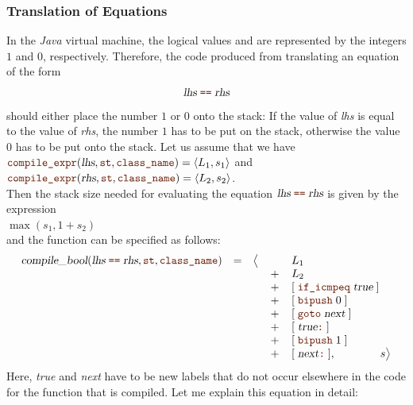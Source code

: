 \subsubsection{Translation of Equations}
In the \textsl{Java} virtual machine, the logical values  and  are represented by
the integers $1$ and $0$, respectively.  Therefore, the code produced from translating an equation of the form 
\[ \textsl{lhs}\; \mytt{==} \;\textsl{rhs} \]
should either place the number $1$ or $0$ onto the stack: If the value of \textsl{lhs} is equal to the value of
\textsl{rhs}, the number $1$ has to be put on the stack, otherwise the value $0$ has to be put onto the stack.
Let us assume that we have
\\[0.2cm]
\hspace*{1.3cm}
$\mytt{compile\_expr}(\textsl{lhs}, \mytt{st}, \mytt{class\_name}) = \pair(L_1, s_1)$ \quad and \\
\hspace*{1.3cm}
$\mytt{compile\_expr}(\textsl{rhs}, \mytt{st}, \mytt{class\_name}) = \pair(L_2, s_2)$.
\\[0.2cm]
Then the stack size needed for evaluating the equation $\textsl{lhs}\; \mytt{==} \;\textsl{rhs}$ is given by
the expression 
\\[0.2cm]
\hspace*{1.3cm}
$\max(s_1, 1 + s_2)$
\\[0.2cm]
and the function  can be specified as follows:
\[
   \begin{array}[t]{lcccl}
   \textsl{compile\_bool}(\textsl{lhs}\;\mytt{==}\;\textsl{rhs}, \mytt{st}, \mytt{class\_name}) & = & 
         \bigl\langle & \quad & L_1  \\
   &&& + & L_2 \\
   &&& + & [ \;\mytt{if\_icmpeq}\; \textsl{true} \; ]  \\
   &&& + & [ \;\mytt{bipush}\;0\; ]  \\
   &&& + & [ \;\mytt{goto}\;\textsl{next}\; ]  \\
   &&& + & [ \;\textsl{true}\mytt{:}\; ]  \\
   &&& + & [ \;\mytt{bipush}\;1\; ]  \\
   &&& + & [ \;\textsl{next}\mytt{:}\; ], \qquad\qquad s \bigr\rangle
   \end{array}
\]
Here, \textsl{true} and \textsl{next} have to be new labels that do not occur elsewhere in the code for the
function that is compiled.  Let me explain this equation in detail:

